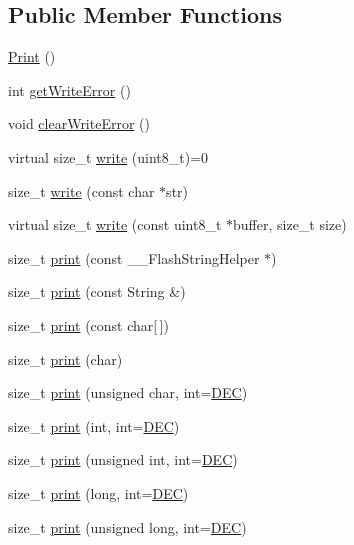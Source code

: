 \subsection*{Public Member Functions}
\begin{DoxyCompactItemize}
\item 
\hyperlink{class_print_a1b9fe938883bb7b4bce8fba012dab112}{Print} ()
\item 
int \hyperlink{class_print_a88a4a829fb5d589efb43955ad0cbddcc}{get\-Write\-Error} ()
\item 
void \hyperlink{class_print_aec9ecf84cc6d9087a650def3cefc459e}{clear\-Write\-Error} ()
\item 
virtual size\-\_\-t \hyperlink{class_print_a5be30d49adae2406a270c29ba9a3e0a3}{write} (uint8\-\_\-t)=0
\item 
size\-\_\-t \hyperlink{class_print_a5b40e0e9cab1f2fe5bb0cb22ffe5adda}{write} (const char $\ast$str)
\item 
virtual size\-\_\-t \hyperlink{class_print_ad98d820df11e2697be1e4b1ea30b4a23}{write} (const uint8\-\_\-t $\ast$buffer, size\-\_\-t size)
\item 
size\-\_\-t \hyperlink{class_print_aa4158dd94bc1741f92d99c427261d7c0}{print} (const \-\_\-\-\_\-\-Flash\-String\-Helper $\ast$)
\item 
size\-\_\-t \hyperlink{class_print_a157007ca7ea8334ba7eb4bc705740216}{print} (const String \&)
\item 
size\-\_\-t \hyperlink{class_print_acfe80773011eb17dfb52c2fba517a093}{print} (const char\mbox{[}$\,$\mbox{]})
\item 
size\-\_\-t \hyperlink{class_print_a1e411d07a8ffec5faf7ce485bac0f029}{print} (char)
\item 
size\-\_\-t \hyperlink{class_print_a97bd44df9222fa4a51a1266fab8d3bc1}{print} (unsigned char, int=\hyperlink{_print_8h_afe38ec6126e35e40049e27fdf4586ba5}{D\-E\-C})
\item 
size\-\_\-t \hyperlink{class_print_a32cb3cf32d701c797b2b2d1080052dfe}{print} (int, int=\hyperlink{_print_8h_afe38ec6126e35e40049e27fdf4586ba5}{D\-E\-C})
\item 
size\-\_\-t \hyperlink{class_print_a87275de35583868a370f43ce1c887750}{print} (unsigned int, int=\hyperlink{_print_8h_afe38ec6126e35e40049e27fdf4586ba5}{D\-E\-C})
\item 
size\-\_\-t \hyperlink{class_print_ab1fb2a2384c7b9f628943f5046e7d1c1}{print} (long, int=\hyperlink{_print_8h_afe38ec6126e35e40049e27fdf4586ba5}{D\-E\-C})
\item 
size\-\_\-t \hyperlink{class_print_a26a40be7a557c0bc391a15dce9f06954}{print} (unsigned long, int=\hyperlink{_print_8h_afe38ec6126e35e40049e27fdf4586ba5}{D\-E\-C})

\end{DoxyCompactItemize}
